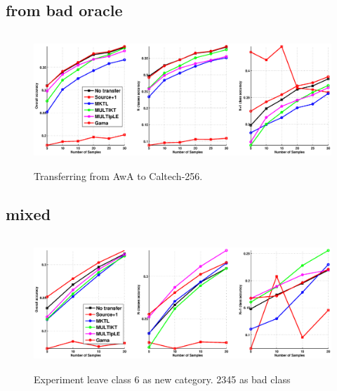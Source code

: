 \subsection{from bad oracle}
\begin{figure}
\includegraphics[width=\textwidth,height=5cm]{fig/A2C_RBF_PHOG.eps}
\caption{Transferring from AwA to Caltech-256.}
\end{figure}

\subsection{mixed}
\begin{figure}
\includegraphics[width=\textwidth,height=5cm]{fig/A2A_MIX_L6_2345.eps}
\caption{Experiment leave class 6 as new category. 2345 as bad class}
\end{figure}
